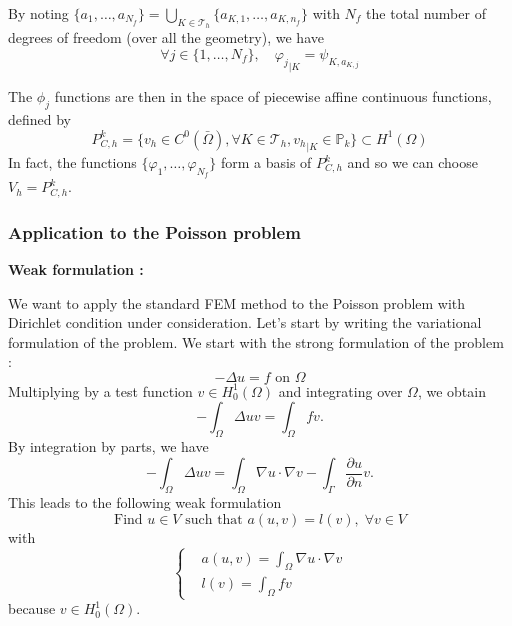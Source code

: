 By noting $\{a_1,\dots,a_{N_f}\}=\bigcup_{K\in\mathcal{T}_h}\{a_{K,1},\dots,a_{K,n_f}\}$ with $N_f$ the total number of degrees of freedom (over all the geometry), we have
\begin{equation*}
	\forall j\in\{1,\dots,N_f\}, \quad {\varphi_j}_{|K}=\psi_{K,a_{K,j}}
\end{equation*}

The $\phi_j$ functions are then in the space of piecewise affine continuous functions, defined by
\begin{equation*}
	P_{C,h}^k=\{v_h\in C^0(\bar{\Omega}), \forall K\in\mathcal{T}_h, {v_h}_{|K}\in\mathbb{P}_k\}\subset H^1(\Omega)
\end{equation*}
In fact, the functions $\{\varphi_1,\dots,\varphi_{N_f}\}$ form a basis of $P_{C,h}^k$ and so we can choose $V_h=P_{C,h}^k$.

\subsubsection{Application to the Poisson problem}

\textbf{Weak formulation :}

We want to apply the standard FEM method to the Poisson problem with Dirichlet condition under consideration. Let's start by writing the variational formulation of the problem. We start with the strong formulation of the problem :
\begin{equation*}
	-\Delta u = f \text{ on } \Omega
\end{equation*}
Multiplying by a test function $v\in H_0^1(\Omega)$ and integrating over $\Omega$, we obtain
\begin{equation*}
	-\int_\Omega \Delta u v = \int_\Omega f v.
\end{equation*}
By integration by parts, we have
\begin{equation*}
	-\int_\Omega \Delta u v = \int_\Omega \nabla u\cdot\nabla v-\int_\Gamma \frac{\partial u}{\partial n}v.
\end{equation*}
This leads to the following weak formulation
\begin{equation*}
		\text{Find } u\in V \text{ such that } a(u,v)=l(v), \;\forall v\in V
\end{equation*}
with
\begin{equation*}
	\left\{\begin{aligned}
		&a(u,v) = \int_\Omega \nabla u\cdot\nabla v \\
		&l(v) = \int_\Omega f v
	\end{aligned}\right.
\end{equation*}
because $v\in H_0^1(\Omega)$.

